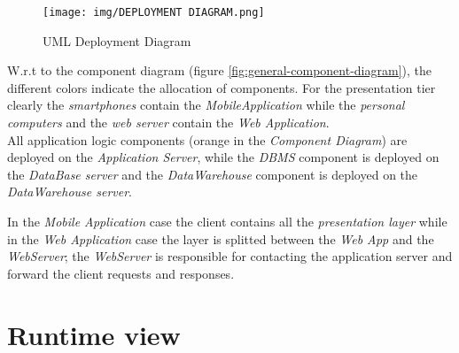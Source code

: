 \documentclass[a4paper]{report}
\begin{document}
\begin{figure}[htp]
\centering
\texttt{[image: img/DEPLOYMENT DIAGRAM.png]}
\caption{UML Deployment Diagram}
\label{fig:deployment-diagram}
\end{figure}

W.r.t to the component diagram (figure \ref{fig:general-component-diagram}), the different colors indicate the allocation of components.
For the presentation tier clearly the \textit{smartphones} contain the \textit{MobileApplication} while the \textit{personal computers} and the \textit{web server} contain the \textit{Web Application}.\\
All application logic components (orange in the \textit{Component Diagram}) are deployed on the \textit{Application Server}, while the \textit{DBMS} component is deployed on the \textit{DataBase server} and the \textit{DataWarehouse} component is deployed on the \textit{DataWarehouse server}.

In the \textit{Mobile Application} case the client contains all the \textit{presentation layer} while in the \textit{Web Application} case the layer is splitted between the \textit{Web App} and the \textit{WebServer}; the \textit{WebServer} is responsible for contacting the application server and forward the client requests and responses.\\

\section{Runtime view}
\end{document}
